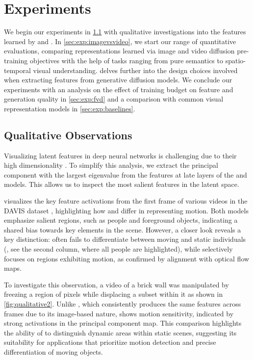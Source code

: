 \section{Experiments}
\label{sec:exp}

We begin our experiments in \cref{sec:exp:qualitative} with qualitative investigations into the features learned by \iwalt and \vwalt.
In \cref{sec:exp:imagevsvideo}, we start our range of quantitative evaluations, comparing representations learned via image and video diffusion pre-training objectives with the help of tasks ranging from pure semantics to spatio-temporal visual understanding.
 delves further into the design choices involved when extracting features from generative diffusion models.
We conclude our experiments with an analysis on the effect of training budget on feature and generation quality in \cref{sec:exp:fvd} and a comparison with common visual representation models in \cref{sec:exp:baselines}.

\subsection{Qualitative Observations}
\label{sec:exp:qualitative}



Visualizing latent features in deep neural networks is challenging due to their high dimensionality \cite{Mahendran_2015_CVPR}.
To simplify this analysis, we extract the principal component with the largest eigenvalue from the features at late layers of the \iwalt and \vwalt models.
This allows us to inspect the most salient features in the latent space.


 visualizes the key feature activations from the first frame of various videos in the DAVIS dataset \cite{davis}, highlighting how \iwalt and \vwalt differ in representing motion. Both models emphasize salient regions, such as people and foreground objects, indicating a shared bias towards key elements in the scene. However, a closer look reveals a key distinction: \iwalt often fails to differentiate between moving and static individuals (\eg, see the second column, where all people are highlighted), while \vwalt selectively focuses on regions exhibiting motion, as confirmed by alignment with optical flow maps.

To investigate this observation, a video of a brick wall was manipulated by freezing a region of pixels while displacing a subset within it as shown in \cref{fig:qualitative2}.
Unlike \iwalt, which consistently produces the same features across frames due to its image-based nature, \vwalt shows motion sensitivity, indicated by strong activations in the principal component map. This comparison highlights the ability of \vwalt to distinguish dynamic areas within static scenes, suggesting its suitability for applications that prioritize motion detection and precise differentiation of moving objects.

